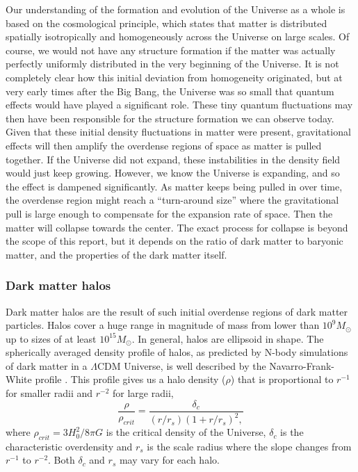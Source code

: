 Our understanding of the formation and evolution of the Universe as a whole is based on the cosmological principle, which states that matter is distributed spatially isotropically and homogeneously across the Universe on large scales. Of course, we would not have any structure formation if the matter was actually perfectly uniformly distributed in the very beginning of the Universe. It is not completely clear how this initial deviation from homogeneity originated, but at very early times after the Big Bang, the Universe was so small that quantum effects would have played a significant role. These tiny quantum fluctuations may then have been responsible for the structure formation we can observe today. Given that these initial density fluctuations in matter were present, gravitational effects will then amplify the overdense regions of space as matter is pulled together. If the Universe did not expand, these instabilities in the density field would just keep growing. However, we know the Universe is expanding, and so the effect is dampened significantly. As matter keeps being pulled in over time, the overdense region might reach a ``turn-around size'' where the gravitational pull is large enough to compensate for the expansion rate of space. Then the matter will collapse towards the center. The exact process for collapse is beyond the scope of this report, but it depends on the ratio of dark matter to baryonic matter, and the properties of the dark matter itself. 

\subsubsection{Dark matter halos}
Dark matter halos are the result of such initial overdense regions of dark matter particles. Halos cover a huge range in magnitude of mass from lower than $10^9 M_{\odot}$ up to sizes of at least $10^{15} M_{\odot}$. In general, halos are ellipsoid in shape. The spherically averaged density profile of halos, as predicted by N-body simulations of dark matter in a $\Lambda$CDM Universe, is well described by the Navarro-Frank-White profile \parencite{Navarro1996}. This profile gives us a halo density ($\rho$) that is proportional to $r^{-1}$ for smaller radii and $r^{-2}$ for large radii,
\begin{equation}
    \frac{\rho}{\rho_{crit}} = \frac{\delta_c}{(r/r_s)(1+r/r_s)^2,}
\end{equation}
where $\rho_{crit} = 3H_0^2/8\pi G$ is the critical density of the Universe, $\delta_c$ is the characteristic overdensity and $r_s$ is the scale radius where the slope changes from $r^{-1}$ to $r^{-2}$. Both $\delta_c$ and $r_s$ may vary for each halo.

